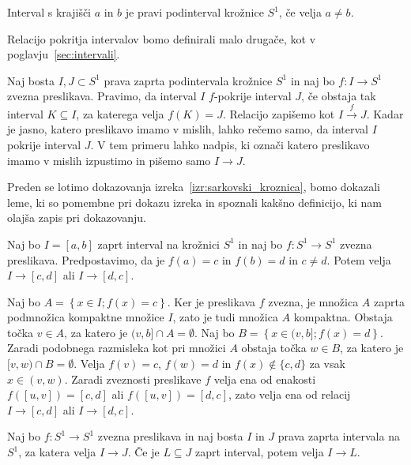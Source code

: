 \documentclass[../TG_magistrsko_delo_sections.tex]{subfiles}
\begin{document}
\begin{opomba}
Interval s krajišči $a$ in $b$ je pravi podinterval krožnice $S^1$, če velja $a \neq b$.
\end{opomba}
Relacijo pokritja intervalov bomo definirali malo drugače, kot v poglavju~\ref{sec:intervali}.

\begin{definicija}\label{def:pokritja_S}
Naj bosta $I, J \subset S^1$ prava zaprta podintervala krožnice $S^1$ in naj bo $f \colon I \to S^1$ zvezna preslikava. Pravimo, da interval $I$ $f$-pokrije interval $J$, če obstaja tak interval $K \subseteq I$, za katerega velja $f(K) = J$. Relacijo zapišemo kot $I \xrightarrow{f} J$. Kadar je jasno, katero preslikavo imamo v mislih, lahko rečemo samo, da interval $I$ pokrije interval $J$. V tem primeru lahko nadpis, ki označi katero preslikavo imamo v mislih izpustimo in pišemo samo $I \to J$.
\end{definicija}

Preden se lotimo dokazovanja izreka~\ref{izr:sarkovski_kroznica}, bomo dokazali leme, ki so pomembne pri dokazu izreka in spoznali kakšno definicijo, ki nam olajša zapis pri dokazovanju.

\begin{lema}\label{lem:1}					%
Naj bo $I=[a, b]$ zaprt interval na krožnici $S^1$ in naj bo $f \colon S^1 \to S^1$ zvezna preslikava. Predpostavimo, da je $f(a) = c$ in $f(b) =d$ in $c \neq d$. Potem velja $I \to [c, d]$ ali $I \to [d, c]$.
\end{lema}

\begin{dokaz}
Naj bo $A = \left\{x \in I; f(x) = c \right\}$. Ker je preslikava $f$ zvezna, je množica $A$ zaprta podmnožica kompaktne množice $I$, zato je tudi množica $A$ kompaktna. Obstaja točka $v \in A$, za katero je $(v, b] \cap A = \emptyset$. Naj bo $B = \left\{x \in (v,b]; f(x) = d \right\}$. Zaradi podobnega razmisleka kot pri množici $A$ obstaja točka $w \in B$, za katero je $[v, w) \cap B = \emptyset$. Velja $f(v) = c$, $f(w)=d$ in $f(x) \notin \{c, d\}$ za vsak $x \in (v, w)$. Zaradi zveznosti preslikave $f$ velja ena od enakosti $f([u, v]) = [c, d]$ ali $f([u, v]) = [d, c]$, zato velja ena od relacij $I \to [c, d]$ ali $I \to [d, c]$.
\end{dokaz}

\begin{lema}\label{lem:2}		%
Naj bo $f \colon S^1 \to S^1$ zvezna preslikava in naj bosta $I$ in $J$ prava zaprta intervala na $S^1$, za katera velja $I \to J$. Če je $L \subseteq J$ zaprt interval, potem velja $I \to L$.
\end{lema}
\end{document}
